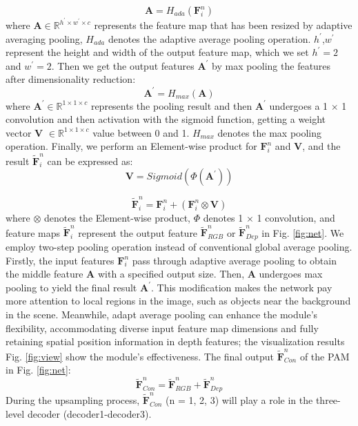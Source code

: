 \documentclass{aims}
\numberwithin{equation}{section}
\begin{document}
\begin{equation}
    \label{eq4}
    \bm A = {H}_{ada}({\bm F}_{i}^{n})
\end{equation}
where $\bm A \in {\mathbb{R}}^{{h}^{\prime} \times {w}^{\prime} \times c}$ represents the feature map that has been resized by adaptive averaging pooling, ${H}_{ada}$ denotes the adaptive average pooling operation. ${h}^{\prime}$,${w}^{\prime}$ represent the height and width of the output feature map, which we set ${h}^{\prime} = 2 $ and ${w}^{\prime} = 2 $. Then we get the output features ${\bm A}^{\prime}$ by max pooling the features after dimensionality reduction:
\begin{equation}
    \label{eq5}
    {\bm A}^{\prime} = {H}_{max}(\bm A)
\end{equation}
where $ {\bm A}^{\prime} \in {\mathbb{R}}^{1\times 1 \times c}$ represents the pooling result and then ${\bm A}^{\prime}$ undergoes a 1 $\times$ 1 convolution and then activation with the sigmoid function, getting a weight vector $\bm V$ $\in {\mathbb{R}}^{1 \times 1\times c}$ value between 0 and 1. ${H}_{max}$ denotes the max pooling operation. Finally, we perform an Element-wise product for ${\bm F}_{i}^{n}$ and $\bm V$, and the result $ \tilde{\bm F}_{i}^{n} $ can be expressed as:
\begin{equation}
    \label{eq6}
    {\bm V} = Sigmoid(\varPhi (\bm {A}^{\prime}))
\end{equation}

\begin{equation}
    \label{eq7}
    \tilde{\bm F}_{i}^{n} = {\bm F}_{i}^{n} + ({\bm F}_{i}^{n} \otimes \bm V)
\end{equation}
where $\otimes$ denotes the Element-wise product, $\varPhi$ denotes 1 $\times$ 1 convolution, and feature maps $\tilde{\bm F}_{i}^{n}$ represent the output feature $\tilde{\bm F}_{RGB}^{n}$ or $\tilde{\bm F}_{Dep}^{n}$ in Fig. \ref{fig:net}. We employ two-step pooling operation instead of conventional global average pooling. Firstly, the input features ${\bm F}_{i}^{n}$ pass through adaptive average pooling to obtain the middle feature $\bm A$ with a specified output size. Then, $\bm A$ undergoes max pooling to yield the final result $\bm A^{\prime}$. This modification makes the network pay more attention to local regions in the image, such as objects near the background in the scene. Meanwhile, adapt average pooling can enhance the module's flexibility, accommodating diverse input feature map dimensions and fully retaining spatial position information in depth features; the visualization results Fig. \ref{fig:view} show the module's effectiveness. The final output $\tilde{\bm F}_{Con}^{n}$ of the PAM in Fig. \ref{fig:net}:
\begin{equation}
    \label{eq8}
    \tilde{\bm F}_{Con}^{n} = \tilde{\bm F}_{RGB}^{n} + \tilde{\bm F}_{Dep}^{n}
\end{equation}
During the upsampling process, $\tilde{\bm F}_{Con}^{n}$ (n = 1, 2, 3) will play a role in the three-level decoder (decoder1-decoder3).
\end{document}
